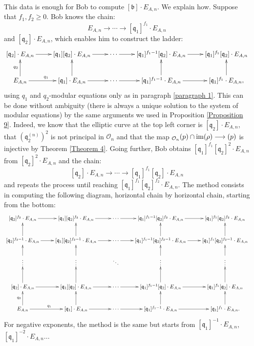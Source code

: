 \documentclass[a4paper,10pt]{report}
\theoremstyle{definition}
\theoremstyle{plain}
\theoremstyle{definition}
\newcommand{\mO}{\mathcal{O}}
\DeclareMathOperator{\im}{im}
\renewcommand{\(}{\left(}
\renewcommand{\)}{\right)}
\newcommand{\mf}[1]{\mathfrak{#1}}
\newcommand{\mfq}{\mathfrak{q}}
\let\SS\relax
\DeclareMathOperator{\SS}{SS}
\begin{document}
This data is enough for Bob to compute $[\mf{b}]\cdot E_{A,n}$. We explain how. Suppose that $f_1, f_2\geq 0$. Bob knows the chain:
\[E_{A,n}\longrightarrow \cdots \longrightarrow [\mf{q}_1]^{f_1}\cdot E_{A,n}\]
and $[\mf{q}_2]\cdot E_{A,n}$, which enables him to construct the ladder:
\[\xymatrix{
[\mf{q}_2]\cdot E_{A,n}  \ar[r] & [\mf{q}_1][\mf{q}_2]\cdot E_{A,n} \ar[r] & \cdots \ar[r] & [\mf{q}_1]^{f_1-1}[\mf{q}_2]\cdot E_{A,n} \ar[r] & [\mf{q}_1]^{f_1}[\mf{q}_2]\cdot E_{A,n}\\
E_{A,n} \ar[u]^{q_2} \ar[r]^{q_1} & [\mf{q}_1]\cdot E_{A,n} \ar[u] \ar[r] & \cdots \ar[r] & [\mf{q}_1]^{f_1-1}\cdot E_{A,n} \ar[u] \ar[r] & [\mf{q}_1]^{f_1}\cdot E_{A,n}, \ar[u]
}\]
using $q_1$ and $q_2$-modular equations only as in paragraph \ref{paragraph 1}. This can be done without ambiguity (there is always a unique solution to the system of modular equations) by the same arguments we used in Proposition \ref{Proposition 9}. Indeed, we know that the elliptic curve at the top left corner is $[\mfq_2]\cdot E_{A,n}$, that $(\mfq_2^{(n)})^2$ is not principal in $\mO_n$ and that the map $\SS_{\mO_n}(p)\cap\im(\rho)\longrightarrow\SS(p)$ is injective by Theorem \ref{Theorem 4}. Going further, Bob obtains $[\mf{q}_1]^{f_1}[\mf{q}_2]^2\cdot E_{A,n}$ from $[\mf{q}_2]^2\cdot E_{A,n}$ and the chain:
\[[\mf{q}_2]\cdot E_{A,n}\longrightarrow \cdots \longrightarrow [\mf{q}_1]^{f_1}[\mf{q}_2]\cdot E_{A,n}\]
and repeats the process until reaching $[\mf{q}_1]^{f_1}[\mf{q}_2]^{f_2}\cdot E_{A,n}$. The method consists in computing the following diagram, horizontal chain by horizontal chain, starting from the bottom:
\[\xymatrix{
[\mf{q}_2]^{f_2}\cdot E_{A,n}  \ar[r] & [\mf{q}_1][\mf{q}_2]^{f_2}\cdot E_{A,n} \ar[r] & \cdots \ar[r] & [\mf{q}_1]^{f_1-1}[\mf{q}_2]^{f_2}\cdot E_{A,n} \ar[r] & [\mf{q}_1]^{f_1}[\mf{q}_2]^{f_2}\cdot E_{A,n}\\
[\mf{q}_2]^{f_2-1}\cdot E_{A,n}  \ar[u] \ar[r] & [\mf{q}_1][\mf{q}_2]^{f_2-1}\cdot E_{A,n} \ar[u] \ar[r] & \cdots \ar[r] & [\mf{q}_1]^{f_1-1}[\mf{q}_2]^{f_2-1}\cdot E_{A,n} \ar[u] \ar[r] & [\mf{q}_1]^{f_1}[\mf{q}_2]^{f_2-1}\cdot E_{A,n}\ar[u]\\
\vdots \ar[u] & \vdots \ar[u] & \ddots & \vdots \ar[u] & \vdots \ar[u]\\
[\mf{q}_2]\cdot E_{A,n}  \ar[u] \ar[r] & [\mf{q}_1][\mf{q}_2]\cdot E_{A,n} \ar[u]\ar[r] & \cdots \ar[r] & [\mf{q}_1]^{f_1-1}[\mf{q}_2]\cdot E_{A,n} \ar[u]\ar[r] & [\mf{q}_1]^{f_1}[\mf{q}_2]\cdot E_{A,n} \ar[u] \\
E_{A,n} \ar[u]^{q_2} \ar[r]^{q_1} & [\mf{q}_1]\cdot E_{A,n} \ar[u] \ar[r] & \cdots \ar[r] & [\mf{q}_1]^{f_1-1}\cdot E_{A,n} \ar[u] \ar[r] & [\mf{q}_1]^{f_1}\cdot E_{A,n}. \ar[u]
}\]
For negative exponents, the method is the same but starts from $[\mf{q}_1]^{-1}\cdot E_{A,n}$, $[\mf{q}_1]^{-2}\cdot E_{A,n}$...  
\end{document}
